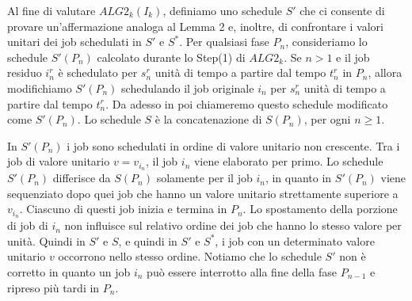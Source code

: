 \documentclass[12pt]{article}
\begin{document}
Al fine di valutare $ALG2_{k}(I_{k})$, definiamo uno schedule $S'$ che ci consente di provare un'affermazione analoga al Lemma 2 e, inoltre, di confrontare i valori unitari dei job schedulati in $S'$ e $S^{*}$. Per qualsiasi fase $P_{n}$, consideriamo lo schedule $S'(P_{n})$ calcolato durante lo Step(1) di $ALG2_{k}$. Se $n > 1$ e il job residuo $i^{r}_{n}$ è schedulato per $s^{r}_{n}$ unità di tempo a partire dal tempo $t^{r}_{n}$ in $P_{n}$, allora modifichiamo $S'(P_{n})$ schedulando il job originale $i_{n}$ per $s^{r}_{n}$ unità di tempo a partire dal tempo $t^{r}_{n}$. Da adesso in poi chiameremo questo schedule modificato come $S'(P_{n})$. Lo schedule $S$ è la concatenazione di $S(P_{n})$, per ogni $n \geq 1$.

In $S'(P_{n})$ i job sono schedulati in ordine di valore unitario non crescente. Tra i job di valore unitario $v = v_{i_{n}}$, il job $i_{n}$ viene elaborato per primo. Lo schedule $S'(P_{n})$ differisce da $S(P_{n})$ solamente per il job $i_{n}$, in quanto in $S'(P_{n})$ viene sequenziato dopo quei job che hanno un valore unitario strettamente superiore a $v_{i_{n}}$. Ciascuno di questi job inizia e termina in $P_{n}$. Lo spostamento della porzione di job di $i_{n}$ non influisce sul relativo ordine dei job che hanno lo stesso valore per unità. Quindi in $S'$ e $S$, e quindi in $S'$ e $S^{*}$, i job con un determinato valore unitario $v$ occorrono nello stesso ordine. Notiamo che lo schedule $S'$ non è corretto in quanto un job $i_{n}$ può essere interrotto alla fine della fase $P_{n-1}$ e ripreso più tardi in $P_{n}$.
\end{document}

